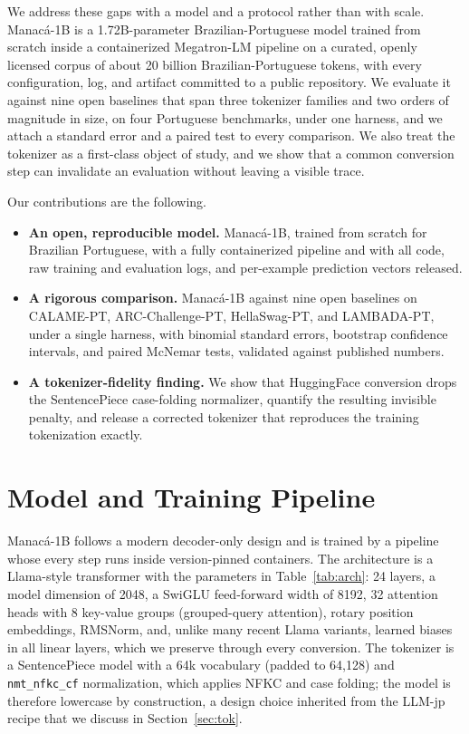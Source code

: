 \documentclass[11pt]{article}
\begin{document}
We address these gaps with a model and a protocol rather than with scale. Manac\'a-1B
is a 1.72B-parameter Brazilian-Portuguese model trained from scratch inside a
containerized Megatron-LM pipeline on a curated, openly licensed corpus of about 20
billion Brazilian-Portuguese tokens, with every configuration, log, and artifact
committed to a public repository. We evaluate it against nine open baselines that
span three tokenizer families and two orders of magnitude in size, on four
Portuguese benchmarks, under one harness, and we attach a standard error and a
paired test to every comparison. We also treat the tokenizer as a first-class
object of study, and we show that a common conversion step can invalidate an
evaluation without leaving a visible trace.

Our contributions are the following.
\begin{itemize}
  \item \textbf{An open, reproducible model.} Manac\'a-1B, trained from scratch for
  Brazilian Portuguese, with a fully containerized pipeline and with all code, raw
  training and evaluation logs, and per-example prediction vectors released.
  \item \textbf{A rigorous comparison.} Manac\'a-1B against nine open baselines on
  CALAME-PT, ARC-Challenge-PT, HellaSwag-PT, and LAMBADA-PT, under a single harness,
  with binomial standard errors, bootstrap confidence intervals, and paired McNemar
  tests, validated against published numbers.
  \item \textbf{A tokenizer-fidelity finding.} We show that HuggingFace conversion
  drops the SentencePiece case-folding normalizer, quantify the resulting invisible
  penalty, and release a corrected tokenizer that reproduces the training
  tokenization exactly.
\end{itemize}

\section{Model and Training Pipeline}
\label{sec:train}

Manac\'a-1B follows a modern decoder-only design and is trained by a pipeline whose
every step runs inside version-pinned containers. The architecture is a Llama-style
transformer with the parameters in Table~\ref{tab:arch}: 24 layers, a model
dimension of 2048, a SwiGLU feed-forward width of 8192, 32 attention heads with 8
key-value groups (grouped-query attention), rotary position embeddings, RMSNorm,
and, unlike many recent Llama variants, learned biases in all linear layers, which
we preserve through every conversion. The tokenizer is a SentencePiece model
\cite{sentencepiece} with a 64k vocabulary (padded to 64{,}128) and \texttt{nmt\_nfkc\_cf} normalization, which
applies NFKC and case folding; the model is therefore lowercase by construction, a
design choice inherited from the LLM-jp recipe that we discuss in
Section~\ref{sec:tok}.
\end{document}
